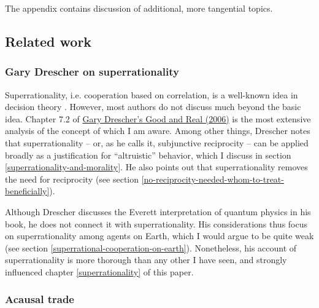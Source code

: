 The appendix contains discussion of additional, more tangential topics.

\hypertarget{related-work}{\subsection{Related
work}\label{related-work}}

\hypertarget{gary-drescher-on-superrationality}{\subsubsection{Gary
Drescher on superrationality}\label{gary-drescher-on-superrationality}}

Superrationality, i.e. cooperation based on correlation, is a well-known
idea in decision theory
\parencite{Kuhn2017-tl,Horgan1981-hb,Hofstadter1983-az,Campbell1985-sx,Ahmed2014-ec}.
However, most authors do not discuss much beyond the basic idea. Chapter
7.2 of
\href{https://www.gwern.net/docs/2006-drescher-goodandreal.pdf}{Gary
Drescher's Good and Real (2006)} is the most extensive analysis
of the concept of which I am aware. Among other things, Drescher notes
that superrationality -- or, as he calls it, subjunctive reciprocity --
can be applied broadly as a justification for ``altruistic'' behavior,
which I discuss in section
\ref{superrationality-and-morality}. He also points out that superrationality removes the
need for reciprocity (see section
\ref{no-reciprocity-needed-whom-to-treat-beneficially}).

Although Drescher discusses the Everett interpretation of quantum
physics in his book, he does not connect it with superrationality. His
considerations thus focus on superrationality among agents on Earth,
which I would argue to be quite weak (see section
\ref{superrational-cooperation-on-earth}). Nonetheless, his account of superrationality is more
thorough than any other I have seen, and strongly influenced chapter \ref{superrationality} of this
paper.

\hypertarget{acausal-trade}{\subsubsection{Acausal
trade}\label{acausal-trade}}

